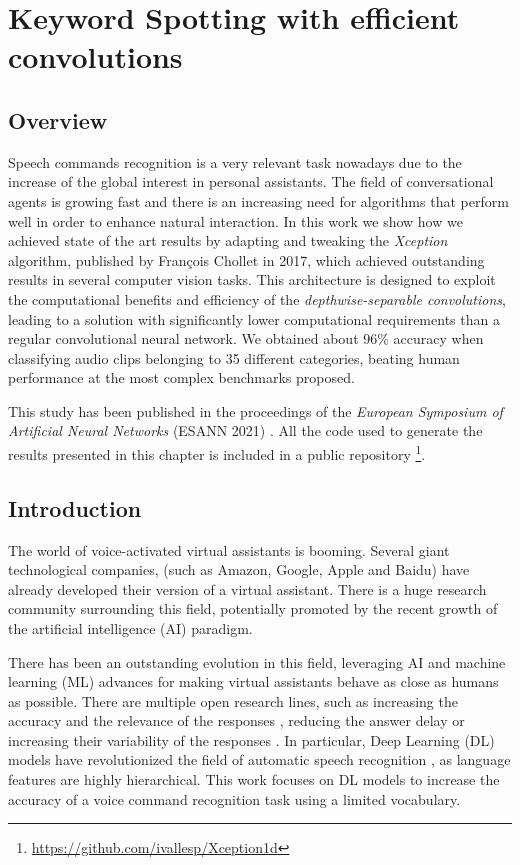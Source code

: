 \chapter{Keyword Spotting with efficient convolutions} \label{ch:kws}

\section{Overview}
Speech commands recognition is a very relevant task nowadays due to the increase of the global interest in personal assistants. The field of conversational agents is growing fast and there is an increasing need for algorithms that perform well in order to enhance natural interaction. In this work we show how we achieved state of the art results by adapting and tweaking the \textit{Xception} algorithm, published by François Chollet in 2017, which achieved outstanding results in several computer vision tasks. This architecture is designed to exploit the computational benefits and efficiency of the \textit{depthwise-separable convolutions}, leading to a solution with significantly lower computational requirements than a regular convolutional neural network. We obtained about 96\% accuracy when classifying audio clips belonging to 35 different categories, beating human performance at the most complex benchmarks proposed.

This study has been published in the proceedings of the \textit{European Symposium of Artificial Neural Networks} (ESANN 2021) \autocite{valles2021a}. All the code used to generate the results presented in this chapter is included in a public repository \footnote{\url{https://github.com/ivallesp/Xception1d}}.

\section{Introduction}
The world of voice-activated virtual assistants is booming. Several giant technological companies, (such as Amazon, Google, Apple and Baidu) have already developed their version of a virtual assistant. There is a huge research community surrounding this field, potentially promoted by the recent growth of the artificial intelligence (AI) paradigm.

There has been an outstanding evolution in this field, leveraging AI and machine learning (ML) advances for  making virtual assistants behave as close as humans as possible. There are multiple open research lines, such as increasing the accuracy and the relevance of the responses \autocite{milabot2017}, reducing the answer delay \autocite{Han2017} or increasing their variability of the responses \autocite{Li2017}. In particular, Deep Learning (DL) models have revolutionized the field of automatic speech recognition \autocite{Nassif2019}, as language features are highly hierarchical. This work focuses on DL models to increase the accuracy of a voice command recognition task using a limited vocabulary.

